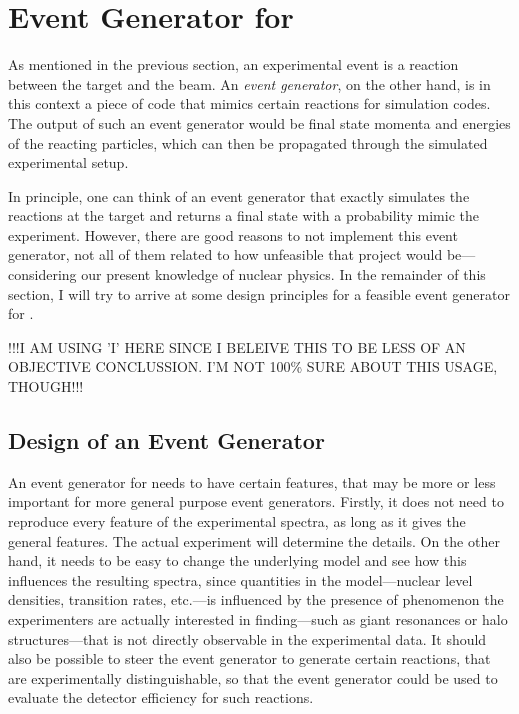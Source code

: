 \section{Event Generator for \rtb{}}
As mentioned in the previous section, an experimental event is a reaction between the target and the beam.
An \emph{event generator}, on the other hand, is in this context a piece of code that mimics certain reactions for simulation codes. The output of such an event generator would be final state momenta and energies of the reacting particles, which can then be propagated through the simulated experimental setup. %

In principle, one can think of an event generator that exactly simulates the reactions at the target and returns a final state with a probability mimic the experiment. However, there are good reasons to not implement this event generator, not all of them related to how unfeasible that project would be---considering our present knowledge of nuclear physics. In the remainder of this section, I will try to arrive at some design principles for a feasible event generator for \rtb{}.

!!!I AM USING 'I' HERE SINCE I BELEIVE THIS TO BE LESS OF AN OBJECTIVE CONCLUSSION. I'M NOT 100\% SURE ABOUT THIS USAGE, THOUGH!!!

\subsection{Design of an Event Generator}
An event generator for \rtb{} needs to have certain features, that may be more or less important for more general purpose event generators.
Firstly, it does not need to reproduce every feature of the experimental spectra, as long as it gives the general features. The actual experiment will determine the details.
On the other hand, it needs to be easy to change the underlying model and see how this influences the resulting spectra, since quantities in the model---nuclear level densities, transition rates, etc.---is influenced by the presence of phenomenon the experimenters are actually interested in finding---such as giant resonances or halo structures---that is not directly observable in the experimental data. 
It should also be possible to steer the event generator to generate certain reactions, that are experimentally distinguishable, so that the event generator could be used to evaluate the detector efficiency for such reactions.

